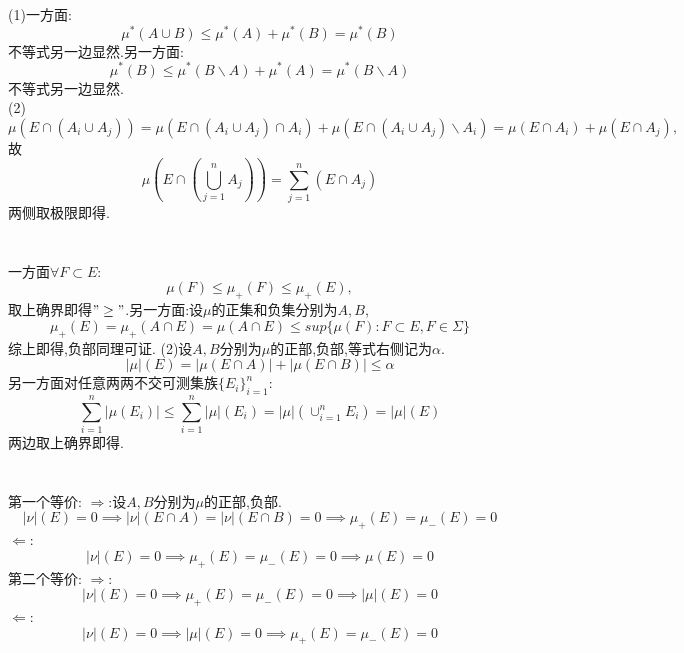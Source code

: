 \documentclass[]{article}
\title{}
\author{}
\begin{document}
\maketitle

\section{}
\noindent (1)一方面:$$\mu^*(A\cup B)\leq \mu^*(A)+\mu^*(B)=\mu^*(B)$$
不等式另一边显然.另一方面:
$$\mu^*(B)\leq \mu^*(B\backslash A)+\mu^*(A)=\mu^*(B\backslash A)$$
不等式另一边显然.\\
(2)$$\mu(E\cap(A_i\cup A_j))=\mu(E\cap(A_i\cup A_j)\cap A_i)+\mu(E\cap(A_i\cup A_j)\backslash A_i)=\mu(E\cap A_i)+\mu(E\cap A_j),$$故
$$\mu(E\cap(\bigcup_{j=1}^{n}A_j))=\sum_{j=1}^{n}(E\cap A_j)$$
两侧取极限即得.
\section{}
\noindent 一方面$\forall F\subset E$:$$\mu(F)\leq\mu_+(F)\leq\mu_+(E),$$
取上确界即得$"\geq"$.另一方面:设$\mu$的正集和负集分别为$A,B$,
$$\mu_+(E)=\mu_+(A\cap E)=\mu(A\cap E)\leq sup\{\mu(F):F\subset E,F\in \Sigma\}$$
综上即得,负部同理可证.
(2)设$A,B$分别为$\mu$的正部,负部,等式右侧记为$\alpha$.
$$|\mu|(E)=|\mu(E\cap A)|+|\mu(E\cap B)|\leq\alpha$$
另一方面对任意两两不交可测集族$\{E_i\}_{i=1}^{n}$:
$$\sum_{i=1}^{n}|\mu(E_i)|\leq\sum_{i=1}^{n}|\mu|(E_i)=|\mu|(\cup_{i=1}^{n}E_i)=|\mu|(E)$$
两边取上确界即得.
\section{}
\noindent 第一个等价:
$\Rightarrow$:设$A,B$分别为$\mu$的正部,负部.
$$|\nu|(E)=0\implies|\nu|(E\cap A)=|\nu|(E\cap B)=0\implies\mu_+(E)=\mu_-(E)=0$$
$\Leftarrow$:
$$|\nu|(E)=0\implies\mu_+(E)=\mu_-(E)=0\implies\mu(E)=0$$
第二个等价:
$\Rightarrow$:
$$|\nu|(E)=0\implies\mu_+(E)=\mu_-(E)=0\implies|\mu|(E)=0$$
$\Leftarrow$:
$$|\nu|(E)=0\implies|\mu|(E)=0\implies\mu_+(E)=\mu_-(E)=0$$
\end{document}

